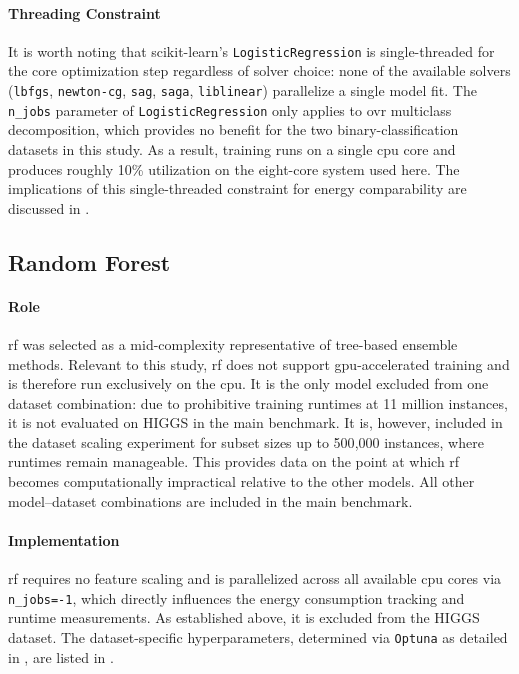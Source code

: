 \paragraph{Threading Constraint}
It is worth noting that scikit-learn's \texttt{LogisticRegression} is single-threaded for the core optimization step regardless of solver choice: none of the available solvers (\texttt{lbfgs}, \texttt{newton-cg}, \texttt{sag}, \texttt{saga}, \texttt{liblinear}) parallelize a single model fit. The \texttt{n\_jobs} parameter of \texttt{LogisticRegression} only applies to \gls{ovr} multiclass decomposition, which provides no benefit for the two binary-classification datasets in this study. As a result, training runs on a single \gls{cpu} core and produces roughly 10\% utilization on the eight-core system used here. The implications of this single-threaded constraint for energy comparability are discussed in .

\subsection{Random Forest}
\label{implementation_rf}

\paragraph{Role}
\gls{rf} was selected as a mid-complexity representative of tree-based ensemble methods. Relevant to this study, \gls{rf} does not support \gls{gpu}-accelerated training and is therefore run exclusively on the \gls{cpu}. It is the only model excluded from one dataset combination: due to prohibitive training runtimes at 11 million instances, it is not evaluated on HIGGS in the main benchmark. It is, however, included in the dataset scaling experiment for subset sizes up to 500{,}000 instances, where runtimes remain manageable. This provides data on the point at which \gls{rf} becomes computationally impractical relative to the other models. All other model--dataset combinations are included in the main benchmark.

\paragraph{Implementation}
\gls{rf} requires no feature scaling and is parallelized across all available \gls{cpu} cores via \texttt{n\_jobs=-1}, which directly influences the energy consumption tracking and runtime measurements. As established above, it is excluded from the HIGGS dataset. The dataset-specific hyperparameters, determined via \texttt{Optuna} as detailed in , are listed in .

